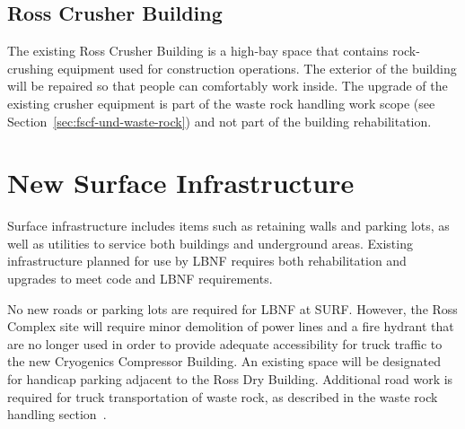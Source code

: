 \subsection{Ross Crusher Building}
\label{sec:fscf-surf-facil-surface-bldg-rosscrusher}

The existing Ross Crusher Building is a high-bay space that contains rock-crushing equipment used for construction operations. The exterior of the building will be repaired 
so that people can comfortably work inside. %
The upgrade of the existing crusher equipment is part of the waste rock handling work scope (see Section~\ref{sec:fscf-und-waste-rock}) and not part of the building rehabilitation. 

\section{New Surface Infrastructure}
\label{sec:fscf-surf-facil-surface-new}

Surface infrastructure includes items such as retaining walls and parking lots, as well as utilities to service both buildings and underground areas.  Existing infrastructure planned for use by LBNF requires both rehabilitation and upgrades to meet code and LBNF requirements. 

No new roads or parking lots are required for LBNF at SURF. However, the Ross Complex site will require minor demolition of power lines and a fire hydrant that are no longer used in order to provide adequate accessibility for truck traffic to the new Cryogenics Compressor Building. An existing space will be designated for handicap parking adjacent to the Ross Dry Building. Additional road work is required for truck transportation of waste rock, as described in the waste rock handling section~\cite{sec:fscf-und-waste-rock}.




